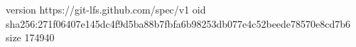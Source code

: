 version https://git-lfs.github.com/spec/v1
oid sha256:271f06407e145dc4f9d5ba88b7fbfa6b98253db077e4c52beede78570e8cd7b6
size 174940
